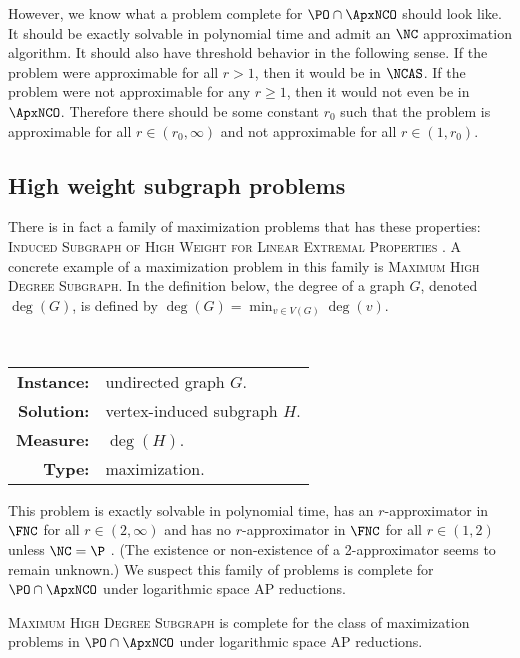 However, we know what a problem complete for $\PO \cap \ApxNCO$ should look like.
It should be exactly solvable in polynomial time and admit an $\NC$ approximation algorithm.
It should also have threshold behavior in the following sense.
If the problem were approximable for all $r > 1$, then it would be in $\NCAS$.
If the problem were not approximable for any $r \geq 1$, then it would not even be in $\ApxNCO$.
Therefore there should be some constant $r_0$ such that the problem is approximable for all $r \in (r_0, \infty)$ and not approximable for all $r \in (1, r_0)$.

\subsection{High weight subgraph problems}

There is in fact a family of maximization problems that has these properties: \textsc{Induced Subgraph of High Weight for Linear Extremal Properties} \cite[Chapter~3]{dsst97}.
A concrete example of a maximization problem in this family is \textsc{Maximum High Degree Subgraph}.
In the definition below, the degree of a graph $G$, denoted $\deg(G)$, is defined by $\deg(G) = \min_{v \in V(G)} \deg(v)$.

\begin{definition}
  \mbox{} \\
  \begin{tabular}{r l}
    \textbf{Instance:} & undirected graph $G$. \\
    \textbf{Solution:} & vertex-induced subgraph $H$. \\
    \textbf{Measure:} & $\deg(H)$. \\
    \textbf{Type:} & maximization.
  \end{tabular}
\end{definition}

This problem is exactly solvable in polynomial time,  has an $r$-approximator in $\FNC$ for all $r \in (2, \infty)$ and has no $r$-approximator in $\FNC$ for all $r \in (1, 2)$ unless $\NC = \P$ \cite{am84}.
(The existence or non-existence of a 2-approximator seems to remain unknown.)
We suspect this family of problems is complete for $\PO \cap \ApxNCO$ under logarithmic space AP reductions.

\begin{conjecture}
  \textsc{Maximum High Degree Subgraph} is complete for the class of maximization problems in $\PO \cap \ApxNCO$ under logarithmic space AP reductions.
\end{conjecture}

